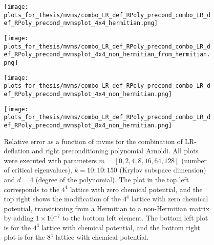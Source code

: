 \begin{figure}[H]
    \centering
    \begin{minipage}{0.45\textwidth}
        \centering
        \texttt{[image: plots\_for\_thesis/mvms/combo\_LR\_def\_RPoly\_precond\_combo\_LR\_def\_RPoly\_precond\_mvmsplot\_4x4\_hermitian.png]} %
    \end{minipage}%
    \hspace{0.02\textwidth} %
    \begin{minipage}{0.45\textwidth}
        \centering
        \texttt{[image: plots\_for\_thesis/mvms/combo\_LR\_def\_RPoly\_precond\_combo\_LR\_def\_RPoly\_precond\_mvmsplot\_4x4\_non\_hermitian\_from\_hermitian.png]} %
    \end{minipage}
    
    \vspace{0.02\textwidth} %
    
    \begin{minipage}{0.45\textwidth}
        \centering
        \texttt{[image: plots\_for\_thesis/mvms/combo\_LR\_def\_RPoly\_precond\_combo\_LR\_def\_RPoly\_precond\_mvmsplot\_4x4\_non\_hermitian.png]} %
    \end{minipage}%
    \hspace{0.02\textwidth} %
    \begin{minipage}{0.45\textwidth}
        \centering
        \texttt{[image: plots\_for\_thesis/mvms/combo\_LR\_def\_RPoly\_precond\_combo\_LR\_def\_RPoly\_precond\_mvmsplot\_8x4\_non\_hermitian.png]} %
    \end{minipage}
    
    \caption{\small Relative error as a function of mvms for the combination of LR-deflation and right preconditioning polynomial Arnoldi. All plots were executed with parameters $m = [0, 2, 4, 8, 16, 64, 128]$ (number of critical eigenvalues), $k = 10:10:150$ (Krylov subspace dimension) and $d = 4$ (degree of the polynomial). The plot in the top left corresponds to the $4^4$ lattice with zero chemical potential, and the top right shows the modification of the $4^4$ lattice with zero chemical potential, transitioning from a Hermitian to a non-Hermitian matrix by adding $1 \times 10^{-7}$ to the bottom left element. The bottom left plot is for the $4^4$ lattice with chemical potential, and the bottom right plot is for the $8^4$ lattice with chemical potential.}
    \label{fig:combo_LR+right_pre_cond_mvms_plot}
\end{figure}

